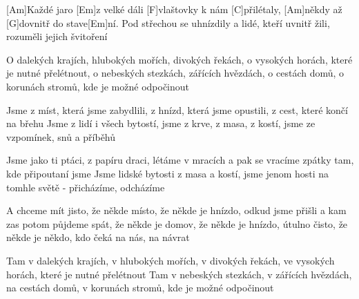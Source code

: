 
[Am]Každé jaro [Em]z velké dáli [F]vlaštovky k nám [C]přilétaly,
[Am]někdy až [G]dovnitř do stave[Em]ní.
Pod střechou se uhnízdily a lidé, kteří uvnitř žili,
rozuměli jejich švitoření

O dalekých krajích, hlubokých mořích, divokých řekách,
o vysokých horách, které je nutné přelétnout,
o nebeských stezkách, zářících hvězdách, o cestách domů,
o korunách stromů, kde je možné odpočinout

Jsme z míst, která jsme zabydlili,
z hnízd, která jsme opustili,
z cest, které končí na břehu
Jsme z lidí i všech bytostí,
jsme z krve, z masa, z kostí,
jsme ze vzpomínek, snů a příběhů

Jsme jako ti ptáci, z papíru draci, létáme v mracích
a pak se vracíme zpátky tam, kde připoutaní jsme
Jsme lidské bytosti z masa a kostí, jsme jenom hosti
na tomhle světě - přicházíme, odcházíme

A chceme mít jisto, že někde místo, že někde je hnízdo,
odkud jsme přišli a kam zas potom půjdeme spát,
že někde je domov, že někde je hnízdo, útulno čisto,
že někde je někdo, kdo čeká na nás, na návrat

Tam v dalekých krajích, v hlubokých mořích, v divokých řekách,
ve vysokých horách, které je nutné přelétnout
Tam v nebeských stezkách, v zářících hvězdách, na cestách domů,
v korunách stromů, kde je možné odpočinout